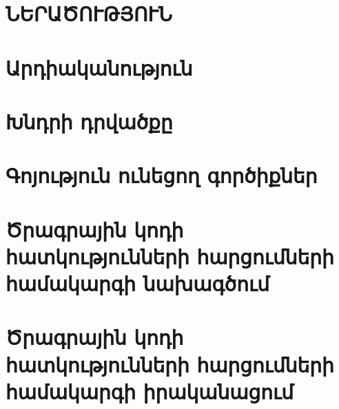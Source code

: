 \documentclass[a4paper, 12pt]{report}
\begin{document}
    

    

    \clearpage
    

    \newpage
    \begin{center}
        \tableofcontents
    \end{center}

    \setcounter{page}{4} %

    \clearpage
    \section*{\textbf{ՆԵՐԱԾՈՒԹՅՈՒՆ}}\label{sec:introduction}
    


    \section{Արդիականություն}\label{sec:modernity}
    


    \section{Խնդրի դրվածքը}\label{sec:problemFormulation}
    


    \section{Գոյություն ունեցող գործիքներ}\label{sec:existingTools}
    


    \section{Ծրագրային կոդի հատկությունների հարցումների համակարգի նախագծում}\label{sec:queryEngineDesign}
    


    \section{Ծրագրային կոդի հատկությունների հարցումների համակարգի իրականացում}\label{sec:queryEngineImplementation}
    
\end{document}
